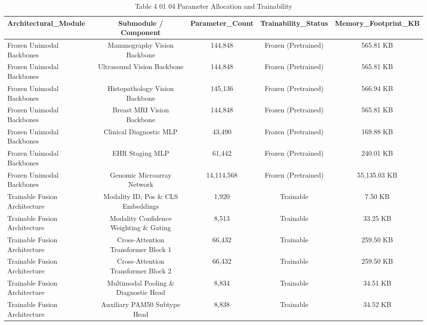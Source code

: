 \begin{table}[htbp]
\centering
\small
\begin{tabular}{lcccc}
\hline
Architectural\_Module & Submodule / Component & Parameter\_Count & Trainability\_Status & Memory\_Footprint\_KB \\
\hline
Frozen Unimodal Backbones & Mammography Vision Backbone & 144,848 & Frozen (Pretrained) & 565.81 KB \\
Frozen Unimodal Backbones & Ultrasound Vision Backbone & 144,848 & Frozen (Pretrained) & 565.81 KB \\
Frozen Unimodal Backbones & Histopathology Vision Backbone & 145,136 & Frozen (Pretrained) & 566.94 KB \\
Frozen Unimodal Backbones & Breast MRI Vision Backbone & 144,848 & Frozen (Pretrained) & 565.81 KB \\
Frozen Unimodal Backbones & Clinical Diagnostic MLP & 43,490 & Frozen (Pretrained) & 169.88 KB \\
Frozen Unimodal Backbones & EHR Staging MLP & 61,442 & Frozen (Pretrained) & 240.01 KB \\
Frozen Unimodal Backbones & Genomic Microarray Network & 14,114,568 & Frozen (Pretrained) & 55,135.03 KB \\
Trainable Fusion Architecture & Modality ID, Pos \& CLS Embeddings & 1,920 & Trainable & 7.50 KB \\
Trainable Fusion Architecture & Modality Confidence Weighting \& Gating & 8,513 & Trainable & 33.25 KB \\
Trainable Fusion Architecture & Cross-Attention Transformer Block 1 & 66,432 & Trainable & 259.50 KB \\
Trainable Fusion Architecture & Cross-Attention Transformer Block 2 & 66,432 & Trainable & 259.50 KB \\
Trainable Fusion Architecture & Multimodal Pooling \& Diagnostic Head & 8,834 & Trainable & 34.51 KB \\
Trainable Fusion Architecture & Auxiliary PAM50 Subtype Head & 8,838 & Trainable & 34.52 KB \\
\hline
\end{tabular}
\caption{Table 4 01 04 Parameter Allocation and Trainability}
\label{tab:table_4_01_04_parameter_allocation_and_trainability}
\end{table}
